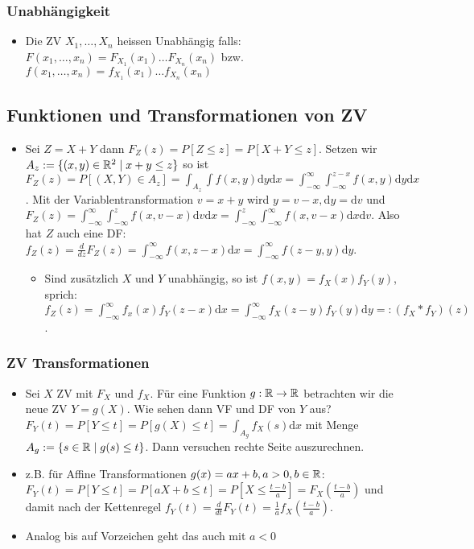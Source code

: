 \subsubsection{Unabhängigkeit}
\begin{itemize}
    \item Die ZV $X_1, \dots, X_n$ heissen Unabhängig falls: $F(x_1, \dots, x_n) = F_{X_1}(x_1) \dots F_{X_n}(x_n)$ bzw. $f(x_1, \dots, x_n) = f_{X_1}(x_1) \dots f_{X_n}(x_n)$
\end{itemize}

\subsection{Funktionen und Transformationen von ZV}
\begin{itemize}
    \item Sei $Z = X + Y$ dann $F_Z(z) = P[Z \le z] = P[X + Y \le z]$. Setzen wir $A_z := \{(x, y) \in \mathbb{R}^2 \mid x + y \le z\}$ so ist $F_Z(z) = P[(X,Y) \in A_z] = \int_{A_z} \int  f(x,y) \mathrm{d}y\mathrm{d}x = \int_{-\infty}^{\infty} \int_{-\infty}^{z - x} f(x,y) \mathrm{d}y\mathrm{d}x$. Mit der Variablentransformation $v = x + y$ wird $y = v - x, \mathrm{d}y = \mathrm{d}v$ und $F_Z(z) = \int_{-\infty}^{\infty} \int_{-\infty}^{z} f(x, v - x) \mathrm{d}v \mathrm{d}x = \int_{-\infty}^{z} \int_{-\infty}^{\infty} f(x, v - x) \mathrm{d}x\mathrm{d}v$. Also hat $Z$ auch eine DF: $f_Z(z) = \frac{d}{dz} F_Z(z) = \int_{-\infty}^{\infty} f(x, z-x) \mathrm{d}x = \int_{-\infty}^{\infty} f(z - y,y) \mathrm{d}y$.
        \begin{itemize}
            \item Sind zusätzlich $X$ und $Y$ unabhängig, so ist $f(x,y) = f_X(x) f_Y(y)$, sprich: $f_Z(z) = \int_{-\infty}^{\infty} f_x(x) f_Y(z - x) \mathrm{d}x = \int_{-\infty}^{\infty} f_X(z - y)f_Y(y) \mathrm{d}y =: (f_X * f_Y)(z)$.
        \end{itemize}
\end{itemize}

\subsubsection{ZV Transformationen}
\begin{itemize}
    \item Sei $X$ ZV mit $F_X$ und $f_X$. Für eine Funktion $g: \mathbb{R} \to \mathbb{R}$ betrachten wir die neue ZV $Y = g(X)$. Wie sehen dann VF und DF von $Y$ aus?
         $F_Y(t) = P[Y \le t] = P[g(X) \le t] = \int_{A_g} f_X(s) \mathrm{d}x$ mit Menge $A_g := \{s \in \mathbb{R} \mid g(s) \le t\}$. Dann versuchen rechte Seite auszurechnen.
    \item z.B. für Affine Transformationen $g(x) = ax + b, a > 0, b \in \mathbb{R}$: $F_Y(t) = P[Y \le t] = P[aX + b \le t] = P[X \le \frac{t - b}{a}] = F_X( \frac{t - b}{a} )$ und damit nach der Kettenregel $f_Y(t) = \frac{d}{dt} F_Y(t) = \frac{1}{a} f_X (\frac{t - b}{a})$.
    \item Analog bis auf Vorzeichen geht das auch mit $a < 0$
\end{itemize}

